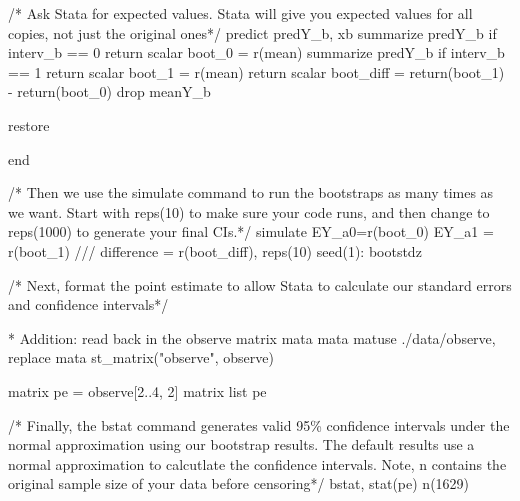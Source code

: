 \documentclass[
  10pt,
  a4paper,
]{book}
\newenvironment{Shaded}{\begin{snugshade}}{\end{snugshade}}
\newcommand{\CommentTok}[1]{\textcolor[rgb]{0.37,0.37,0.37}{#1}}
\newcommand{\DecValTok}[1]{\textcolor[rgb]{0.68,0.00,0.00}{#1}}
\newcommand{\FunctionTok}[1]{\textcolor[rgb]{0.28,0.35,0.67}{#1}}
\newcommand{\KeywordTok}[1]{\textcolor[rgb]{0.00,0.46,0.62}{#1}}
\newcommand{\NormalTok}[1]{\textcolor[rgb]{0.00,0.46,0.62}{#1}}
\newcommand{\OtherTok}[1]{\textcolor[rgb]{0.00,0.46,0.62}{#1}}
\newcommand{\StringTok}[1]{\textcolor[rgb]{0.13,0.47,0.30}{#1}}
\begin{document}
\begin{Shaded}
\begin{Highlighting}[]
\CommentTok{/* Ask Stata for expected values.}
\CommentTok{Stata will give you expected values for all copies, not just the}
\CommentTok{original ones*/}
\KeywordTok{predict}\NormalTok{ predY\_b, }\KeywordTok{xb}
\KeywordTok{summarize}\NormalTok{ predY\_b }\KeywordTok{if}\NormalTok{ interv\_b == 0}
\FunctionTok{return} \FunctionTok{scalar}\NormalTok{ boot\_0 = }\FunctionTok{r}\NormalTok{(}\KeywordTok{mean}\NormalTok{)}
\KeywordTok{summarize}\NormalTok{ predY\_b }\KeywordTok{if}\NormalTok{ interv\_b == 1}
\FunctionTok{return} \FunctionTok{scalar}\NormalTok{ boot\_1 = }\FunctionTok{r}\NormalTok{(}\KeywordTok{mean}\NormalTok{)}
\FunctionTok{return} \FunctionTok{scalar}\NormalTok{ boot\_diff = }\FunctionTok{return}\NormalTok{(boot\_1) {-} }\FunctionTok{return}\NormalTok{(boot\_0)}
\KeywordTok{drop}\NormalTok{ meanY\_b}

\KeywordTok{restore}

\KeywordTok{end}

\CommentTok{/* Then we use the \textasciigrave{}simulate\textasciigrave{} command to run the bootstraps as many}
\CommentTok{times as we want.}
\CommentTok{Start with reps(10) to make sure your code runs, and then change to}
\CommentTok{reps(1000) to generate your final CIs.*/}
\KeywordTok{simulate}\NormalTok{ EY\_a0=}\FunctionTok{r}\NormalTok{(boot\_0) EY\_a1 = }\FunctionTok{r}\NormalTok{(boot\_1) }\CommentTok{///}
\NormalTok{  difference = }\FunctionTok{r}\NormalTok{(boot\_diff), reps(10) }\DecValTok{seed}\NormalTok{(1): bootstdz}

\CommentTok{/* Next, format the point estimate to allow Stata to calculate our}
\CommentTok{standard errors and confidence intervals*/}
  
\NormalTok{* Addition: read back }\KeywordTok{in}\NormalTok{ the observe }\FunctionTok{matrix}  
\KeywordTok{mata} \KeywordTok{mata}\NormalTok{ matuse ./}\KeywordTok{data}\NormalTok{/observe, }\KeywordTok{replace}
\KeywordTok{mata}\NormalTok{ st\_matrix(}\StringTok{"observe"}\NormalTok{, observe)}

\FunctionTok{matrix}\NormalTok{ pe = observe[2..4, 2]\textquotesingle{}}
\FunctionTok{matrix} \OtherTok{list}\NormalTok{ pe}

\CommentTok{/* Finally, the bstat command generates valid 95\% confidence intervals}
\CommentTok{under the normal approximation using our bootstrap results.}
\CommentTok{The default results use a normal approximation to calcutlate the}
\CommentTok{confidence intervals.}
\CommentTok{Note, n contains the original sample size of your data before censoring*/}
\KeywordTok{bstat}\NormalTok{, stat(pe) n(1629) }
\end{Highlighting}
\end{Shaded}
\end{document}

